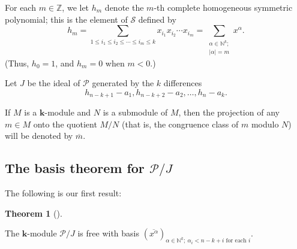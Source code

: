 \documentclass[numbers=enddot,12pt,final,onecolumn,notitlepage]{scrartcl}%
\theoremstyle{definition}
\newtheorem{theo}{Theorem}[section]
\newenvironment{theorem}[1][]
{\begin{theo}[#1]\begin{leftbar}}
{\end{leftbar}\end{theo}}
\let\sumnonlimits\sum
\renewcommand{\sum}{\sumnonlimits\limits}
\begin{document}
For each $m\in\mathbb{Z}$, we let $h_{m}$ denote the $m$-th complete
homogeneous symmetric polynomial; this is the element of $\mathcal{S}$ defined
by%
\begin{equation}
h_{m}=\sum_{1\leq i_{1}\leq i_{2}\leq\cdots\leq i_{m}\leq k}x_{i_{1}}x_{i_{2}%
}\cdots x_{i_{m}}=\sum_{\substack{\alpha\in\mathbb{N}^{k};\\\left\vert
\alpha\right\vert =m}}x^{\alpha}. \label{eq.hm}%
\end{equation}
(Thus, $h_{0}=1$, and $h_{m}=0$ when $m<0$.)

Let $J$ be the ideal of $\mathcal{P}$ generated by the $k$ differences%
\begin{equation}
h_{n-k+1}-a_{1},h_{n-k+2}-a_{2},\ldots,h_{n}-a_{k}. \label{eq.gensJ}%
\end{equation}


If $M$ is a $\mathbf{k}$-module and $N$ is a submodule of $M$, then the
projection of any $m\in M$ onto the quotient $M/N$ (that is, the congruence
class of $m$ modulo $N$) will be denoted by $\overline{m}$.

\subsection{The basis theorem for $\mathcal{P}/J$}

The following is our first result:


\begin{theorem}
\label{thm.P/J}The $\mathbf{k}$-module $\mathcal{P}/J$ is free with basis
$\left(  \overline{x^{\alpha}}\right)  _{\alpha\in\mathbb{N}^{k};\ \alpha
_{i}<n-k+i\text{ for each }i}$.
\end{theorem}
\end{document}
